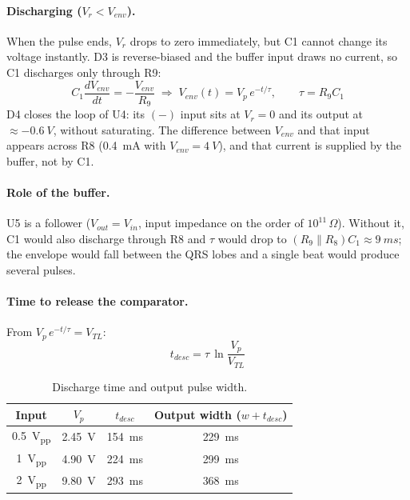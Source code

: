 \documentclass[11pt,letterpaper]{article}
\newcommand{\Vr}{V_r}
\newcommand{\Venv}{V_{env}}
\newcommand{\VTL}{V_{TL}}
\begin{document}
\paragraph{Discharging ($\Vr<\Venv$).} When the pulse ends, $\Vr$ drops to zero immediately, but C1 cannot change its voltage instantly. D3 is reverse-biased and the buffer input draws no current, so C1 discharges only through R9:
\begin{equation}
C_1\frac{d\Venv}{dt}=-\frac{\Venv}{R_9}\;\Rightarrow\;\Venv(t)=V_p\,e^{-t/\tau},\qquad \tau=R_9C_1
\label{eq:descarga}
\end{equation}
D4 closes the loop of U4: its $(-)$ input sits at $\Vr=0$ and its output at $\approx-\SI{0.6}{V}$, without saturating. The difference between $\Venv$ and that input appears across R8 (\SI{0.4}{mA} with $\Venv=\SI{4}{V}$), and that current is supplied by the buffer, not by C1.

\paragraph{Role of the buffer.} U5 is a follower ($V_{out}=V_{in}$, input impedance on the order of $10^{11}\,\Omega$). Without it, C1 would also discharge through R8 and $\tau$ would drop to $(R_9\parallel R_8)C_1\approx\SI{9}{ms}$; the envelope would fall between the QRS lobes and a single beat would produce several pulses.

\paragraph{Time to release the comparator.} From $V_p\,e^{-t/\tau}=\VTL$:
\begin{equation}
t_{desc}=\tau\,\ln\frac{V_p}{\VTL}
\label{eq:tdesc}
\end{equation}

\begin{table}[H]
\centering
\caption{Discharge time and output pulse width.}\label{tab:tdesc}
\begin{tabular}{@{}cccc@{}}
\toprule
Input & $V_p$ & $t_{desc}$ & Output width ($w+t_{desc}$) \\
\midrule
\SI{0.5}{V_{pp}} & \SI{2.45}{V} & \SI{154}{ms} & \SI{229}{ms} \\
\SI{1}{V_{pp}} & \SI{4.90}{V} & \SI{224}{ms} & \SI{299}{ms} \\
\SI{2}{V_{pp}} & \SI{9.80}{V} & \SI{293}{ms} & \SI{368}{ms} \\
\bottomrule
\end{tabular}
\end{table}
\end{document}
